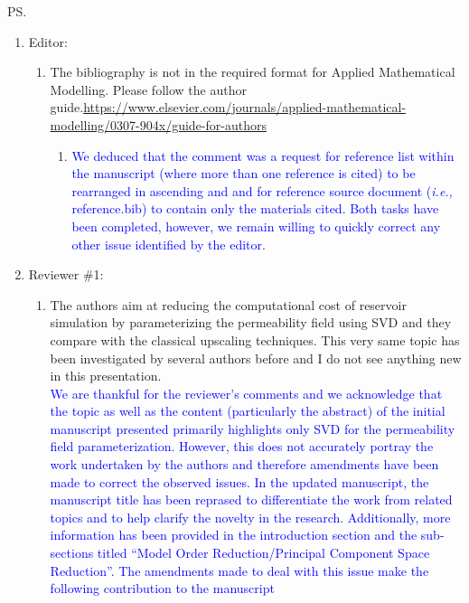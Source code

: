\documentclass[11pt]{letter} %
\newcommand{\blue}{\textcolor{blue}}
\newcommand{\ie}{{\it i.e., }}
\begin{document}
\begin{letter}
\ps{
  \begin{enumerate}
  \item Editor:   
    \begin{enumerate}
    \item \label{R_E} The bibliography is not in the required format for Applied Mathematical Modelling. Please follow the author guide.\url{https://www.elsevier.com/journals/applied-mathematical-modelling/0307-904x/guide-for-authors}
      \begin{enumerate}
      \item \label{R_E_P1} \blue{We deduced that the comment was a request for reference list within the manuscript (where more than one reference is cited) to be rearranged in ascending and and for reference source document (\ie{reference.bib}) to contain only the materials cited. Both tasks have been completed, however, we remain willing to quickly correct any other issue identified by the editor.}
        \end{enumerate}
      \end{enumerate}    
  \item Reviewer \#1: 
    \begin{enumerate}
    \item \label{R_R1_Novelty} The authors aim at reducing the computational cost of reservoir simulation by parameterizing the permeability field using SVD and they compare with the classical upscaling techniques. This very same topic has been investigated by several authors before and I do not see anything new in this presentation.\\
      \blue {We are thankful for the reviewer's comments and we acknowledge that the topic as well as the content (particularly the abstract) of the initial manuscript presented  primarily highlights only SVD for the permeability field parameterization. However, this does not accurately portray the work undertaken by the authors and therefore amendments have been made to correct the observed issues. In the updated manuscript, the manuscript title has been reprased to differentiate the work from related topics and to help clarify the novelty in the research. Additionally, more information has been provided in the introduction section and the sub-sections titled ``Model Order Reduction/Principal Component Space Reduction''. The amendments made to deal with this issue make the following contribution to the manuscript}
      \begin{enumerate}

\end{enumerate}
\end{enumerate}
\end{enumerate}}
\end{letter}
\end{document}
